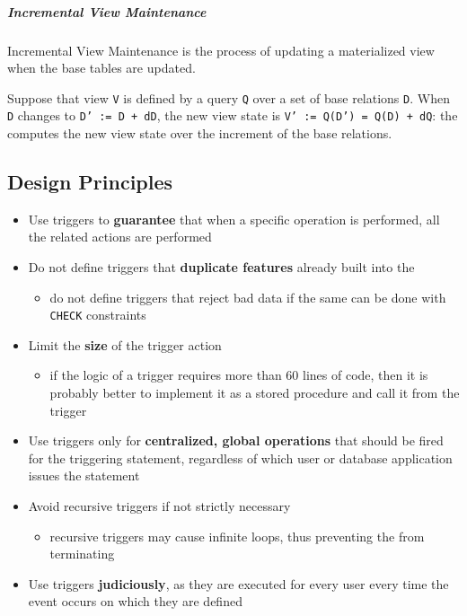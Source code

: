 \documentclass[english]{article}
\begin{document}
\subparagraph*{Incremental View Maintenance}
Incremental View Maintenance is the process of updating a materialized view when the base tables are updated.

Suppose that view \texttt{V} is defined by a query \texttt{Q} over a set of base relations \texttt{D}.
When \texttt{D} changes to \texttt{D' := D + dD}, the new view state is \texttt{V' := Q(D') = Q(D) + dQ}:
the \dbms computes the new view state over the increment of the base relations.

\subsection{Design Principles}

\begin{itemize}
  \item Use triggers to \textbf{guarantee} that when a specific operation is performed, all the related actions are performed
  \item Do not define triggers that \textbf{duplicate features} already built into the \dbms
        \begin{itemize}[label=\(\rightarrow\)]
          \item do not define triggers that reject bad data if the same can be done with \sql \texttt{CHECK} constraints
        \end{itemize}
  \item Limit the \textbf{size} of the trigger action
        \begin{itemize}[label=\(\rightarrow\)]
          \item if the logic of a trigger requires more than \(60\) lines of code, then it is probably better to implement it as a stored procedure and call it from the trigger
        \end{itemize}
  \item Use triggers only for \textbf{centralized, global operations} that should be fired for the triggering statement, regardless of which user or database application issues the statement
  \item Avoid recursive triggers if not strictly necessary
        \begin{itemize}[label=\(\rightarrow\)]
          \item recursive triggers may cause infinite loops, thus preventing the \dbms from terminating
        \end{itemize}
  \item Use triggers \textbf{judiciously}, as they are executed for every user every time the event occurs on which they are defined
\end{itemize}
\end{document}
